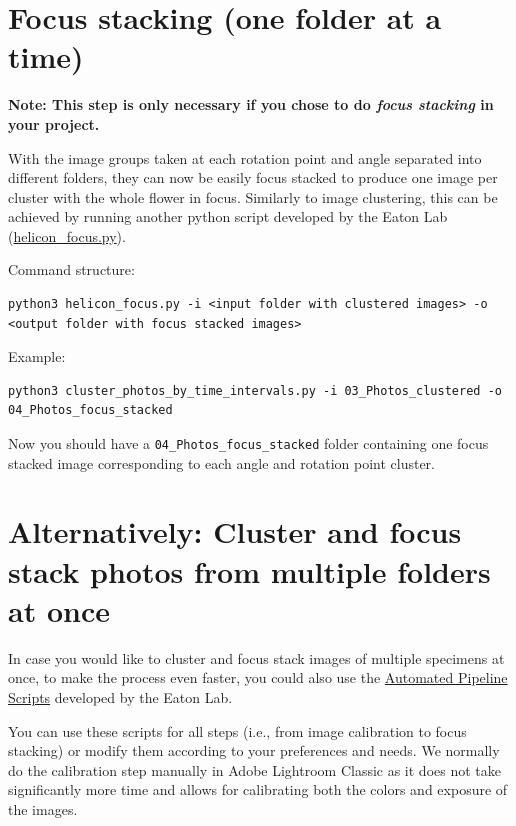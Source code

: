 \documentclass[
]{book}
\begin{document}
\hypertarget{focus-stacking-one-folder-at-a-time}{%
\section{Focus stacking (one folder at a time)}\label{focus-stacking-one-folder-at-a-time}}

{\textbf{Note: This step is only necessary if you chose to do \emph{focus stacking} in your project.}}

With the image groups taken at each rotation point and angle separated into different folders,
they can now be easily focus stacked to produce one image per cluster with the whole flower in focus.
Similarly to image clustering, this can be achieved by running another python script developed by the Eaton Lab
(\href{https://github.com/yuemeanshappy/photogram/blob/main/python_scripts/helicon_focus.py}{helicon\_focus.py}).

Command structure:

\begin{verbatim}
python3 helicon_focus.py -i <input folder with clustered images> -o <output folder with focus stacked images>
\end{verbatim}

Example:

\begin{verbatim}
python3 cluster_photos_by_time_intervals.py -i 03_Photos_clustered -o 04_Photos_focus_stacked
\end{verbatim}

Now you should have a \texttt{04\_Photos\_focus\_stacked} folder containing one focus
stacked image corresponding to each angle and rotation point cluster.

\hypertarget{alternatively-cluster-and-focus-stack-photos-from-multiple-folders-at-once}{%
\section{Alternatively: Cluster and focus stack photos from multiple folders at once}\label{alternatively-cluster-and-focus-stack-photos-from-multiple-folders-at-once}}

In case you would like to cluster and focus stack images of multiple specimens at
once, to make the process even faster, you could also use the \href{https://github.com/yuemeanshappy/photogram/wiki/Automated-pipeline-scripts}{Automated Pipeline Scripts}
developed by the Eaton Lab.

You can use these scripts for all steps (i.e., from image
calibration to focus stacking) or modify them according to your preferences and needs.
We normally do the calibration step manually in Adobe Lightroom Classic as it does not take
significantly more time and allows for calibrating both the colors and exposure of the images.
\end{document}
